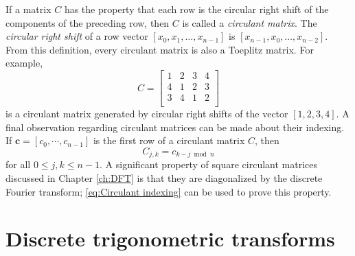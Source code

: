 If a matrix $C$ has the property that each row is the circular right shift of the components of the preceding row, then $C$ is called a \textit{circulant matrix}. The \textit{circular right shift} of a row vector $[x_0,x_1,\ldots,x_{n-1}]$ is $[x_{n-1},x_0,\ldots,x_{n-2}]$. From this definition, every circulant matrix is also a Toeplitz matrix. For example,
\[C = \begin{bmatrix}
1 & 2 & 3 & 4 \\
4 & 1 & 2 & 3 \\
3 & 4 & 1 & 2 \\
\end{bmatrix}\] 
is a circulant matrix generated by circular right shifts of the vector $[1,2,3,4]$. A final observation regarding circulant matrices can be made about their indexing. If $\mathbf{c} = [c_0,\cdots,c_{n-1}]$ is the first row of a circulant matrix $C$, then
\begin{equation}
\label{eq:Circulant indexing}
C_{j,k} = c_{k-j \bmod n}
\end{equation}
for all $0 \leq j,k \leq n-1$. A significant property of square circulant matrices discussed in Chapter \ref{ch:DFT} is that they are diagonalized by the discrete Fourier transform; \eqref{eq:Circulant indexing} can be used to prove this property.

\section{Discrete trigonometric transforms} \label{sec:Discrete trig. transforms}

